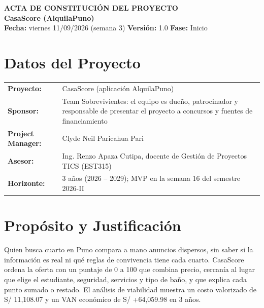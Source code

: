 \documentclass[11pt,a4paper]{article}
\begin{document}
\begin{center}
    {\Large \textbf{\textcolor{AzulUNA}{ACTA DE CONSTITUCIÓN DEL PROYECTO}}}\\[3pt]
    {\normalsize \textbf{CasaScore (AlquilaPuno)}}\\[4pt]
    \footnotesize \textbf{Fecha:} viernes 11/09/2026 (semana 3) \quad \textbar\quad \textbf{Versión:} 1.0 \quad \textbar\quad \textbf{Fase:} Inicio
\end{center}

\vspace{0.1cm}

\section{Datos del Proyecto}
\noindent\begin{tabularx}{\textwidth}{@{}P{4.2cm} L@{}}
\toprule
\textbf{Proyecto:} & CasaScore (aplicación AlquilaPuno) \\
\textbf{Sponsor:} & Team Sobrevivientes: el equipo es dueño, patrocinador y responsable de presentar el proyecto a concursos y fuentes de financiamiento \\
\textbf{Project Manager:} & Clyde Neil Paricahua Pari \\
\textbf{Asesor:} & Ing. Renzo Apaza Cutipa, docente de Gestión de Proyectos TICS (EST315) \\
\textbf{Horizonte:} & 3 años (2026 -- 2029); MVP en la semana 16 del semestre 2026-II \\
\bottomrule
\end{tabularx}

\section{Propósito y Justificación}
Quien busca cuarto en Puno compara a mano anuncios dispersos, sin saber si la información es real ni qué reglas de convivencia tiene cada cuarto. CasaScore ordena la oferta con un puntaje de 0 a 100 que combina precio, cercanía al lugar que elige el estudiante, seguridad, servicios y tipo de baño, y que explica cada punto sumado o restado. El análisis de viabilidad muestra un costo valorizado de S/ 11,108.07 y un VAN económico de S/ +64,059.98 en 3 años.
\end{document}
